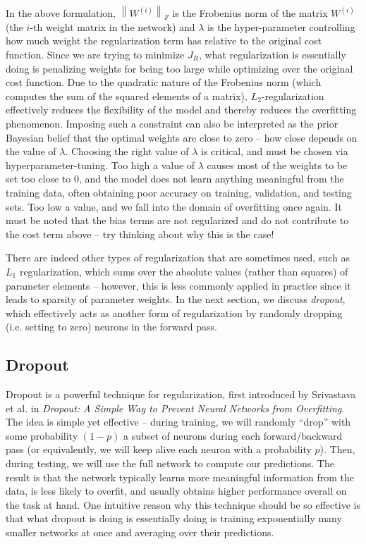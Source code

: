 \documentclass{tufte-handout}
\newcommand{\norm}[1]{\left\lVert#1\right\rVert}
\begin{document}
In the above formulation, $\norm{W^{(i)}}_F$ is the Frobenius norm of the matrix $W^{(i)}$ (the $i$-th weight matrix in the network) and $\lambda$ is the hyper-parameter controlling how much weight the regularization term has relative to the original cost function. Since we are trying to minimize $J_R$, what regularization is essentially doing is penalizing weights for being too large while optimizing over the original cost function. Due to the quadratic nature of the Frobenius norm (which computes the sum of the squared elements of a matrix), $L_2$-regularization effectively reduces the flexibility of the model and thereby reduces the overfitting phenomenon. Imposing such a constraint can also be interpreted as the prior Bayesian belief that the optimal weights are close to zero -- how close depends on the value of $\lambda$. Choosing the right value of $\lambda$ is critical, and must be chosen via hyperparameter-tuning. Too high a value of $\lambda$ causes most of the weights to be set too close to $0$, and the model does not learn anything meaningful from the training data, often obtaining poor accuracy on training, validation, and testing sets. Too low a value, and we fall into the domain of overfitting once again. It must be noted that the bias terms are not regularized and do not contribute to the cost term above -- try thinking about why this is the case!

There are indeed other types of regularization that are sometimes used, such as $L_1$ regularization, which sums over the absolute values (rather than squares) of parameter elements -- however, this is less commonly applied in practice since it leads to sparsity of parameter weights. In the next section, we discuss \textit{dropout}, which effectively acts as another form of regularization by randomly dropping (i.e. setting to zero) neurons in the forward pass.

\subsection{Dropout}

Dropout is a powerful technique for regularization, first introduced by Srivastava et al. in \textit{Dropout: A Simple Way to Prevent Neural Networks from Overfitting}.  The idea is simple yet effective -- during training, we will randomly ``drop'' with some probability $(1-p)$ a subset of neurons during each forward/backward pass (or equivalently, we will keep alive each neuron with a probability $p$). Then, during testing, we will use the full network to compute our predictions. The result is that the network typically learns more meaningful information from the data, is less likely to overfit, and usually obtains higher performance overall on the task at hand. One intuitive reason why this technique should be so effective is that what dropout is doing is essentially doing is training exponentially many smaller networks at once and averaging over their predictions. 
\end{document}
